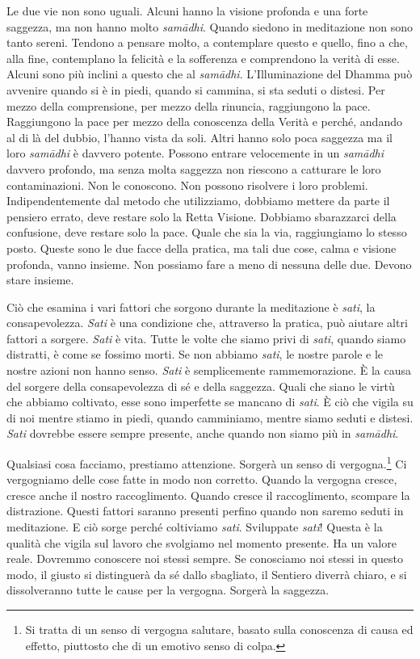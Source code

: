 Le due vie non sono uguali. Alcuni hanno la visione profonda e una forte
saggezza, ma non hanno molto \emph{samādhi}. Quando siedono in
meditazione non sono tanto sereni. Tendono a pensare molto, a
contemplare questo e quello, fino a che, alla fine, contemplano la
felicità e la sofferenza e comprendono la verità di esse. Alcuni sono
più inclini a questo che al \emph{samādhi}. L'Illuminazione del Dhamma
può avvenire quando si è in piedi, quando si cammina, si sta seduti o
distesi. Per mezzo della comprensione, per mezzo della rinuncia,
raggiungono la pace. Raggiungono la pace per mezzo della conoscenza
della Verità e perché, andando al di là del dubbio, l'hanno vista da
soli. Altri hanno solo poca saggezza ma il loro \emph{samādhi} è davvero
potente. Possono entrare velocemente in un \emph{samādhi} davvero
profondo, ma senza molta saggezza non riescono a catturare le loro
contaminazioni. Non le conoscono. Non possono risolvere i loro problemi.
Indipendentemente dal metodo che utilizziamo, dobbiamo mettere da parte
il pensiero errato, deve restare solo la Retta Visione. Dobbiamo
sbarazzarci della confusione, deve restare solo la pace. Quale che sia
la via, raggiungiamo lo stesso posto. Queste sono le due facce della
pratica, ma tali due cose, calma e visione profonda, vanno insieme. Non
possiamo fare a meno di nessuna delle due. Devono stare insieme.

Ciò che esamina i vari fattori che sorgono durante la meditazione è
\emph{sati}, la consapevolezza. \emph{Sati} è una condizione che,
attraverso la pratica, può aiutare altri fattori a sorgere. \emph{Sati}
è vita. Tutte le volte che siamo privi di \emph{sati}, quando siamo
distratti, è come se fossimo morti. Se non abbiamo \emph{sati}, le
nostre parole e le nostre azioni non hanno senso. \emph{Sati} è
semplicemente rammemorazione. È la causa del sorgere della
consapevolezza di sé e della saggezza. Quali che siano le virtù che
abbiamo coltivato, esse sono imperfette se mancano di \emph{sati}. È ciò
che vigila su di noi mentre stiamo in piedi, quando camminiamo, mentre
siamo seduti e distesi. \emph{Sati} dovrebbe essere sempre presente,
anche quando non siamo più in \emph{samādhi}.

Qualsiasi cosa facciamo, prestiamo attenzione. Sorgerà un senso di
vergogna.\footnote{Si tratta di un senso di vergogna salutare, basato
  sulla conoscenza di causa ed effetto, piuttosto che di un emotivo
  senso di colpa.} Ci vergogniamo delle cose fatte in modo non corretto.
Quando la vergogna cresce, cresce anche il nostro raccoglimento. Quando
cresce il raccoglimento, scompare la distrazione. Questi fattori saranno
presenti perfino quando non saremo seduti in meditazione. E ciò sorge
perché coltiviamo \emph{sati}. Sviluppate \emph{sati}! Questa è la
qualità che vigila sul lavoro che svolgiamo nel momento presente. Ha un
valore reale. Dovremmo conoscere noi stessi sempre. Se conosciamo noi
stessi in questo modo, il giusto si distinguerà da sé dallo sbagliato,
il Sentiero diverrà chiaro, e si dissolveranno tutte le cause per la
vergogna. Sorgerà la saggezza.


